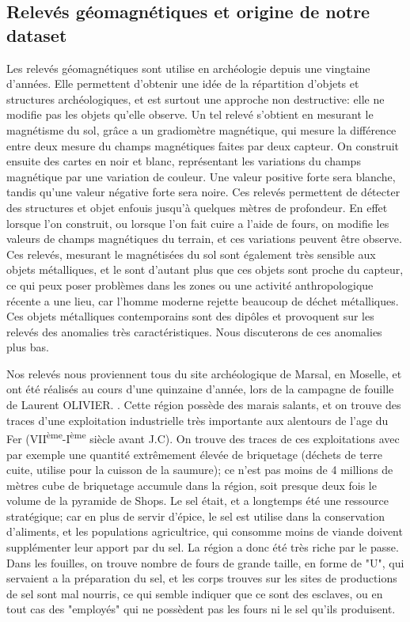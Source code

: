 \documentclass[a4paper, 12pt, titlepage, oneside, french]{article}
\begin{document}
	\subsection{Relevés géomagnétiques et origine de notre dataset}
	Les relevés géomagnétiques sont utilise en archéologie depuis une vingtaine d'années. Elle permettent d'obtenir une idée de la répartition d'objets et structures archéologiques, et est surtout une approche non destructive: elle ne modifie pas les objets qu'elle observe. Un tel relevé s'obtient en mesurant le magnétisme du sol, grâce a un gradiomètre magnétique, qui mesure la différence entre deux mesure du champs magnétiques faites par deux capteur. On construit ensuite des cartes en noir et blanc, représentant les variations du champs magnétique par une variation de couleur. Une valeur positive forte sera blanche, tandis qu'une valeur négative forte sera noire. Ces relevés permettent de détecter des structures et objet enfouis jusqu'à quelques mètres de profondeur. En effet lorsque l'on construit, ou lorsque l'on fait cuire a l'aide de fours, on modifie les valeurs de champs magnétiques du terrain, et ces variations peuvent être observe. Ces relevés, mesurant le magnétisées du sol sont également très sensible aux objets métalliques, et le sont d'autant plus que ces objets sont proche du capteur, ce qui peux poser problèmes dans les zones ou une activité anthropologique récente a une lieu, car l'homme moderne rejette beaucoup de déchet métalliques. Ces objets métalliques contemporains sont des dipôles et provoquent sur les relevés des anomalies très caractéristiques. Nous discuterons de ces anomalies plus bas.

	Nos relevés nous proviennent tous du site archéologique de Marsal, en Moselle, et ont été réalisés au cours d'une quinzaine d'année, lors de la campagne de fouille de Laurent OLIVIER.%
	. Cette région possède des marais salants, et on trouve des traces d'une exploitation industrielle très importante aux alentours de l'age du Fer (VII\textsuperscript{ème}-I\textsuperscript{ème} siècle avant J.C). On trouve des traces de ces exploitations avec par exemple une quantité extrêmement élevée de briquetage (déchets de terre cuite, utilise pour la cuisson de la saumure); ce n'est pas moins de 4 millions de mètres cube de briquetage accumule dans la région, soit presque deux fois le volume de la pyramide de Shops. Le sel était, et a longtemps été une ressource stratégique; car en plus de servir d'épice, le sel est utilise dans la conservation d'aliments, et les populations agricultrice, qui consomme moins de viande doivent supplémenter leur apport par du sel. La région a donc été très riche par le passe. Dans les fouilles, on trouve nombre de fours de grande taille, en forme de "U", qui servaient a la préparation du sel, et les corps trouves sur les sites de productions de sel sont mal nourris, ce qui semble indiquer que ce sont des esclaves, ou en tout cas des "employés" qui ne possèdent pas les fours ni le sel qu'ils produisent. 
\end{document}
